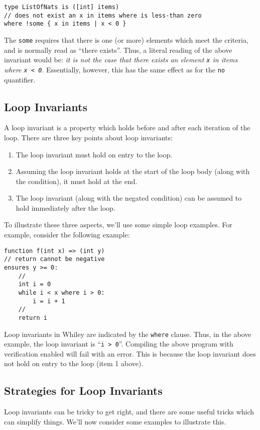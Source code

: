 \begin{lstlisting}
type ListOfNats is ([int] items)
// does not exist an x in items where is less-than zero
where !some { x in items | x < 0 }
\end{lstlisting}

The \lstinline{some} requires that there is one (or more) elements which meet the criteria, and is normally read as ``there exists''.  Thus, a literal reading of the above invariant would be: {\em it is not the case that there exists an element \lstinline{x} in items where \lstinline{x < 0}}.  Essentially, however, this has the same effect as for the \lstinline{no} quantifier.  

\subsection{Loop Invariants}
\label{loop_invariants}

A loop invariant is a property which
holds before and after each iteration of the loop.  There are three
key points about loop invariants:
\begin{enumerate}
\item The loop invariant must hold on entry to the loop.
\item Assuming the loop invariant holds at the start of the loop body
  (along with the condition), it must hold at the end.
\item The loop invariant (along with the negated condition) can be
  assumed to hold immediately after the loop.
\end{enumerate}

To illustrate these three aspects, we'll use some simple loop
examples.  For example, consider the following example:

\begin{lstlisting}
function f(int x) => (int y)
// return cannot be negative
ensures y >= 0:
    //
    int i = 0
    while i < x where i > 0:
        i = i + 1 
    //
    return i
\end{lstlisting}

Loop invariants in Whiley are indicated by the \lstinline{where}
clause.  Thus, in the above example, the loop invariant is
``\lstinline{i > 0}''.  Compiling the above program with verification
enabled will fail with an error.   This is because the loop invariant
does not hold on entry to the loop (item 1 above).

\subsection{Strategies for Loop Invariants}
Loop invariants can be tricky to get right, and there are some useful
tricks which can simplify things.  We'll now consider some examples to
illustrate this.

